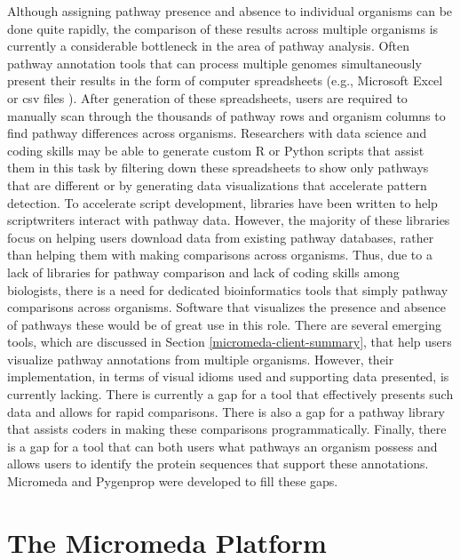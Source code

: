 Although assigning pathway presence and absence to individual organisms can be 
done quite rapidly, the comparison of these results across multiple organisms is 
currently a considerable bottleneck in the area of pathway analysis. Often 
pathway annotation tools that can process multiple genomes simultaneously 
present their results in the form of computer spreadsheets (e.g., Microsoft 
Excel or \gls{csv} files \cite{RFC4180}). After generation of these 
spreadsheets, users are required to manually scan through the thousands of 
pathway rows and organism columns to find pathway differences across organisms. 
Researchers with data science and coding skills may be able to generate custom R 
or Python scripts that assist them in this task by filtering down these 
spreadsheets to show only pathways that are different or by generating data 
visualizations that accelerate pattern detection. To accelerate script 
development, libraries have been written to help scriptwriters interact with 
pathway data. However, the majority of these libraries focus on helping users 
download data from existing pathway databases, rather than helping them with 
making comparisons across organisms. Thus, due to a lack of libraries for 
pathway comparison and lack of coding skills among biologists, there is a need 
for dedicated bioinformatics tools that simply pathway comparisons across 
organisms. Software that visualizes the presence and absence of pathways these 
would be of great use in this role. There are several emerging tools, which are 
discussed in Section \ref{micromeda-client-summary}, that help users visualize 
pathway annotations from multiple organisms. However, their implementation, in 
terms of visual idioms used and supporting data presented, is currently lacking. 
There is currently a gap for a tool that effectively presents such data and 
allows for rapid comparisons. There is also a gap for a pathway library that 
assists coders in making these comparisons programmatically. Finally, there is a 
gap for a tool that can both users what pathways an organism possess and allows 
users to identify the protein sequences that support these annotations. 
Micromeda and Pygenprop were developed to fill these gaps.

\section{The Micromeda Platform} \label{micromeda-overview}

